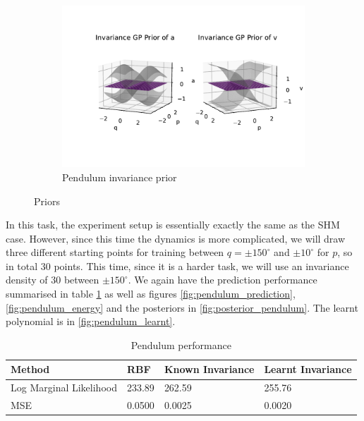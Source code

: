\documentclass{statsmsc}
\begin{document}
\begin{figure}[H]
\begin{subfigure}[b]{0.8\linewidth}
         \includegraphics[width=\linewidth]{../codes/figures/prior_pendulum_invariance.pdf}
         \caption{Pendulum invariance prior}
         \label{fig:prior_pendulum_invariance}
     \end{subfigure}
        \caption{Priors}
        \label{fig:priors}
\end{figure}

In this task, the experiment setup is essentially exactly the same as the SHM case. 
However, since this time the dynamics is more complicated, we will draw three different starting points for training between $q=\pm 150^{\circ}$ and $\pm 10^{\circ}$ for $p$, so in total 30 points.
This time, since it is a harder task, we will use an invariance density of 30 between $\pm 150^{\circ}$.
We again have the prediction performance summarised in table \ref{tab:pendulum_performance} as well as figures \ref{fig:pendulum_prediction}, \ref{fig:pendulum_energy} and the posteriors in \ref{fig:posterior_pendulum}.
The learnt polynomial is in \ref{fig:pendulum_learnt}.

\begin{table}[H]
  \centering
  \begin{tabular}{ l l l l}
    \hline
Method           & RBF & Known Invariance&  Learnt Invariance\\
                    \hline
Log Marginal Likelihood & 233.89 & 262.59 & 255.76  \\
MSE & 0.0500 & 0.0025 & 0.0020 \\
    \hline
  \end{tabular}
  \caption{Pendulum performance}
  \label{tab:pendulum_performance}
\end{table}
\end{document}
